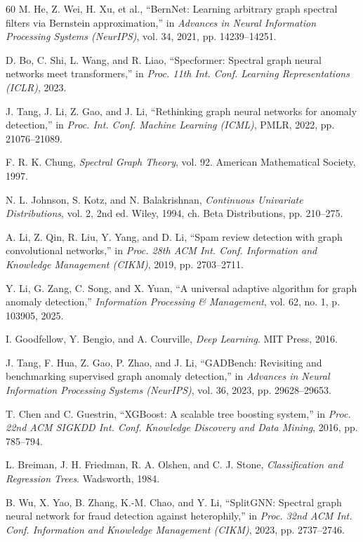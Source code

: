 \documentclass[10pt,a4paper,twocolumn]{article}
\begin{document}
\begin{thebibliography}{60}
 M. He, Z. Wei, H. Xu, et al., ``BernNet: Learning arbitrary graph spectral filters via Bernstein approximation,'' in \textit{Advances in Neural Information Processing Systems (NeurIPS)}, vol. 34, 2021, pp. 14239--14251.

 D. Bo, C. Shi, L. Wang, and R. Liao, ``Specformer: Spectral graph neural networks meet transformers,'' in \textit{Proc. 11th Int. Conf. Learning Representations (ICLR)}, 2023.

 J. Tang, J. Li, Z. Gao, and J. Li, ``Rethinking graph neural networks for anomaly detection,'' in \textit{Proc. Int. Conf. Machine Learning (ICML)}, PMLR, 2022, pp. 21076--21089.

 F. R. K. Chung, \textit{Spectral Graph Theory}, vol. 92. American Mathematical Society, 1997.

 N. L. Johnson, S. Kotz, and N. Balakrishnan, \textit{Continuous Univariate Distributions}, vol. 2, 2nd ed. Wiley, 1994, ch. Beta Distributions, pp. 210--275.

 A. Li, Z. Qin, R. Liu, Y. Yang, and D. Li, ``Spam review detection with graph convolutional networks,'' in \textit{Proc. 28th ACM Int. Conf. Information and Knowledge Management (CIKM)}, 2019, pp. 2703--2711.

 Y. Li, G. Zang, C. Song, and X. Yuan, ``A universal adaptive algorithm for graph anomaly detection,'' \textit{Information Processing \& Management}, vol. 62, no. 1, p. 103905, 2025.

 I. Goodfellow, Y. Bengio, and A. Courville, \textit{Deep Learning}. MIT Press, 2016.

 J. Tang, F. Hua, Z. Gao, P. Zhao, and J. Li, ``GADBench: Revisiting and benchmarking supervised graph anomaly detection,'' in \textit{Advances in Neural Information Processing Systems (NeurIPS)}, vol. 36, 2023, pp. 29628--29653.

 T. Chen and C. Guestrin, ``XGBoost: A scalable tree boosting system,'' in \textit{Proc. 22nd ACM SIGKDD Int. Conf. Knowledge Discovery and Data Mining}, 2016, pp. 785--794.

 L. Breiman, J. H. Friedman, R. A. Olshen, and C. J. Stone, \textit{Classification and Regression Trees}. Wadsworth, 1984.

 B. Wu, X. Yao, B. Zhang, K.-M. Chao, and Y. Li, ``SplitGNN: Spectral graph neural network for fraud detection against heterophily,'' in \textit{Proc. 32nd ACM Int. Conf. Information and Knowledge Management (CIKM)}, 2023, pp. 2737--2746.


\end{thebibliography}
\end{document}
